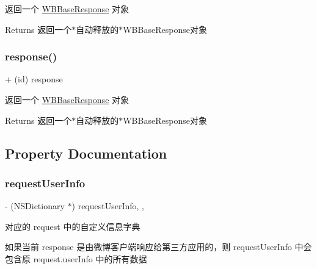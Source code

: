 返回一个 \mbox{\hyperlink{interface_w_b_base_response}{W\+B\+Base\+Response}} 对象

\begin{DoxyReturn}{Returns}
返回一个$\ast$自动释放的$\ast$\+W\+B\+Base\+Response对象 
\end{DoxyReturn}
\mbox{\label{interface_w_b_base_response_adbd83297d349925f1964bc854589da24}} 
\subsubsection{\texorpdfstring{response()}{response()}\hspace{0.1cm}{\footnotesize\ttfamily [3/3]}}
{\footnotesize\ttfamily + (id) response \begin{DoxyParamCaption}{ }\end{DoxyParamCaption}}

返回一个 \mbox{\hyperlink{interface_w_b_base_response}{W\+B\+Base\+Response}} 对象

\begin{DoxyReturn}{Returns}
返回一个$\ast$自动释放的$\ast$\+W\+B\+Base\+Response对象 
\end{DoxyReturn}


\subsection{Property Documentation}
\mbox{\label{interface_w_b_base_response_ab0e1042b2da7e0301eba30c2231d36a8}} 
\subsubsection{\texorpdfstring{request\+User\+Info}{requestUserInfo}}
{\footnotesize\ttfamily -\/ (N\+S\+Dictionary $\ast$) request\+User\+Info\hspace{0.3cm}{\ttfamily [read]}, {\ttfamily [nonatomic]}, {\ttfamily [strong]}}

对应的 request 中的自定义信息字典

如果当前 response 是由微博客户端响应给第三方应用的，则 request\+User\+Info 中会包含原 request.\+user\+Info 中的所有数据

